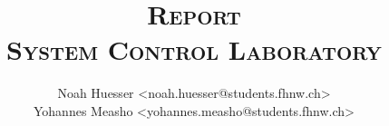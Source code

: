 \author{
  Noah Huesser <noah.huesser@students.fhnw.ch>\\
  Yohannes Measho <yohannes.measho@students.fhnw.ch>
}

\title{
    \vspace{20mm}
    \Huge{
        \textsc{
            Report\\
            System Control Laboratory
        }
    }
}
